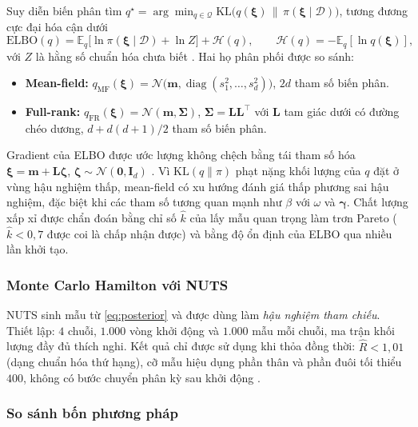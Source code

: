 \documentclass[12pt,a4paper]{article}
\theoremstyle{definition}
\theoremstyle{remark}
\newcommand{\E}{\mathbb{E}}
\newcommand{\bxi}{\boldsymbol{\xi}}
\newcommand{\bgamma}{\boldsymbol{\gamma}}
\begin{document}
Suy diễn biến phân tìm $q^\star=\arg\min_{q\in\mathcal Q}\mathrm{KL}\big(q(\bxi)\,\|\,\pi(\bxi\mid\mathcal D)\big)$, tương đương cực đại hóa cận dưới
\begin{equation}
\mathrm{ELBO}(q)=\E_{q}\big[\ln\pi(\bxi\mid\mathcal D)+\ln Z\big]+\mathcal H(q),\qquad \mathcal H(q)=-\E_q[\ln q(\bxi)],
\end{equation}
với $Z$ là hằng số chuẩn hóa chưa biết \cite{blei2017,kucukelbir2017}. Hai họ phân phối được so sánh:
\begin{itemize}
\item \textbf{Mean-field:} $q_{\mathrm{MF}}(\bxi)=\mathcal N\big(\mathbf m,\operatorname{diag}(s_1^2,\dots,s_d^2)\big)$, $2d$ tham số biến phân.
\item \textbf{Full-rank:} $q_{\mathrm{FR}}(\bxi)=\mathcal N(\mathbf m,\boldsymbol\Sigma)$, $\boldsymbol\Sigma=\mathbf L\mathbf L^\top$ với $\mathbf L$ tam giác dưới có đường chéo dương, $d+d(d+1)/2$ tham số biến phân.
\end{itemize}
Gradient của ELBO được ước lượng không chệch bằng tái tham số hóa $\bxi=\mathbf m+\mathbf L\boldsymbol\zeta$, $\boldsymbol\zeta\sim\mathcal N(\mathbf 0,\mathbf I_d)$ \cite{kingma2014}. Vì $\mathrm{KL}(q\|\pi)$ phạt nặng khối lượng của $q$ đặt ở vùng hậu nghiệm thấp, mean-field có xu hướng đánh giá thấp phương sai hậu nghiệm, đặc biệt khi các tham số tương quan mạnh như $\beta$ với $\omega$ và $\bgamma$. Chất lượng xấp xỉ được chẩn đoán bằng chỉ số $\hat k$ của lấy mẫu quan trọng làm trơn Pareto ($\hat k<0{,}7$ được coi là chấp nhận được) \cite{yao2018} và bằng độ ổn định của ELBO qua nhiều lần khởi tạo.

\subsubsection{Monte Carlo Hamilton với NUTS}

NUTS \cite{hoffman2014} sinh mẫu từ \eqref{eq:posterior} và được dùng làm \emph{hậu nghiệm tham chiếu}. Thiết lập: $4$ chuỗi, $1.000$ vòng khởi động và $1.000$ mẫu mỗi chuỗi, ma trận khối lượng đầy đủ thích nghi. Kết quả chỉ được sử dụng khi thỏa đồng thời: $\hat R<1{,}01$ (dạng chuẩn hóa thứ hạng), cỡ mẫu hiệu dụng phần thân và phần đuôi tối thiểu $400$, không có bước chuyển phân kỳ sau khởi động \cite{vehtari2021}.

\subsubsection{So sánh bốn phương pháp}
\end{document}
